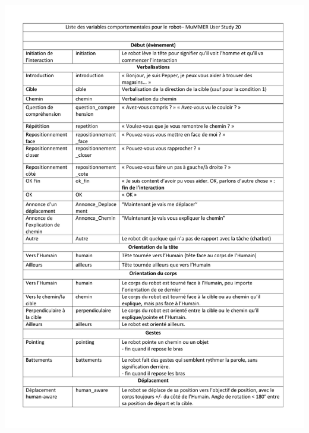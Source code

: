 \begin{center}
	\includegraphics[page=1, width=\textwidth]{figures/annexe1/ROBOTrepertoirecomportemental_MuMMER.pdf} 
\end{center}

